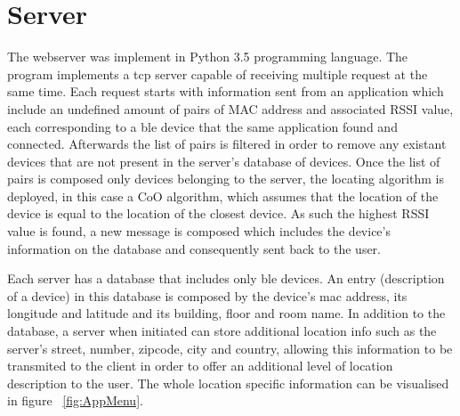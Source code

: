 \section{Server}
\label{sec:server}

The webserver was implement in Python 3.5 programming language. The program implements a tcp server capable of receiving multiple request at the same time. Each request starts with information sent from an application which include an undefined amount of pairs of MAC address and associated RSSI value, each corresponding to a ble device that the same application found and connected. Afterwards the list of pairs is filtered in order to remove any existant devices that are not present in the server's database of devices. Once the list of pairs is composed only devices belonging to the server, the locating algorithm is deployed, in this case a \ac{CoO} algorithm, which assumes that the location of the device is equal to the location of the closest device. As such the highest \ac{RSSI} value is found, a new message is composed which includes the device's information on the database and consequently sent back to the user. 

Each server has a database that includes only ble devices. An entry (description of a device) in this database is composed by the device's mac address, its longitude and latitude and its building, floor and room name. In addition to the database, a server when initiated can store additional location info such as the server's street, number, zipcode, city and country, allowing this information to be transmited to the client in order to offer an additional level of location description to the user. The whole location specific information can be visualised in figure ~\ref{fig:AppMenu}.
